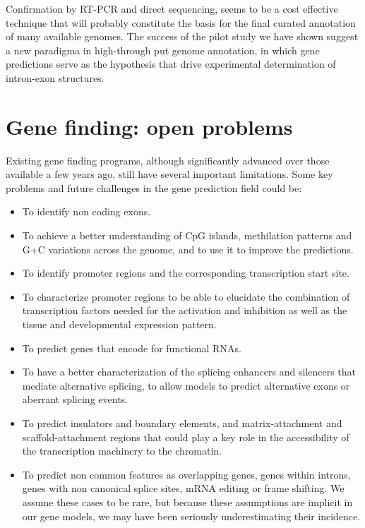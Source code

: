 Confirmation by RT-PCR and direct sequencing, seems to be a cost
effective technique that will probably constitute the basis for the
final curated annotation of many available genomes. The success of the
pilot study we have shown suggest a new paradigma in high-through put
genome annotation, in which gene predictions serve as the hypothesis
that drive experimental determination of intron-exon structures.

\section{Gene finding: open problems}

Existing gene finding programs, although significantly advanced over
those available a few years ago, still have several important
limitations. Some key problems and future challenges in the
gene prediction field could be:

\begin{itemize}

\item To identify non coding exons. 

\item To achieve a better understanding of CpG islands, methilation 
patterns and G+C variations across the genome, and to use it to
improve the predictions.

\item To identify promoter regions and the corresponding transcription 
start site.

\item To characterize promoter regions to be able to elucidate 
the combination of transcription factors needed for the activation and
inhibition as well as the tissue and developmental expression pattern.

\item To predict genes that encode for functional RNAs.

\item To have a better characterization of the splicing enhancers and 
silencers that mediate alternative splicing, to allow models to
predict alternative exons or aberrant splicing events.

\item To predict insulators and boundary elements, and matrix-attachment 
and scaffold-attachment regions that could play a key role in the
accessibility of the transcription machinery to the chromatin.

\item To predict non common features as overlapping genes, genes within 
introns, genes with non canonical splice sites, mRNA editing or frame
shifting. We assume these cases to be rare, but because these
assumptions are implicit in our gene models, we may have been
seriously underestimating their incidence.

\end{itemize}

